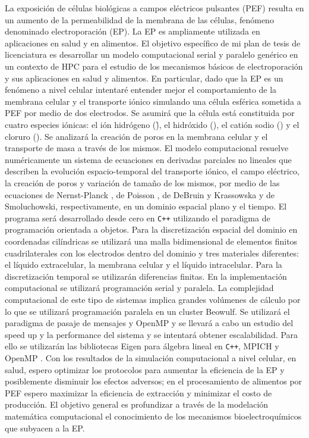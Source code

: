 \documentclass[a4paper,spanish]{article}
\begin{document}
La exposición de células biológicas a campos eléctricos pulsantes (PEF) resulta en un aumento de la permeabilidad de la membrana de las células, fenómeno denominado electroporación (EP). La EP es ampliamente utilizada en aplicaciones en salud y en alimentos. El objetivo específico de mi plan de tesis de licenciatura es desarrollar un modelo computacional serial y paralelo genérico en un contexto de HPC para el estudio de los mecanismos básicos de electroporación y sus aplicaciones en salud y alimentos.  En particular, dado que la EP es un fenómeno a nivel celular intentaré entender mejor el comportamiento de la membrana celular y el transporte iónico simulando una célula esférica sometida a PEF por medio de dos electrodos. Se asumirá que la célula está constituida  por cuatro especies iónicas: el ión hidrógeno (\h), el hidróxido (\oh), el catión sodio (\na) y el cloruro (\cl). Se  analizará la creación de poros en la membrana celular y el transporte de masa a través de los mismos. El modelo computacional resuelve numéricamente un sistema de ecuaciones en derivadas parciales no lineales que describen la evolución espacio-temporal del transporte iónico, el campo eléctrico, la creación de poros y variación de tamaño de los mismos, por medio de las ecuaciones de Nernst-Planck \cite{fodava}, de Poisson \cite{jianbo}, de DeBruin y Krassowska \cite{krass} y de Smoluchowski, respectivamente, en un dominio espacial plano y el tiempo. El programa será desarrollado desde cero en \texttt{C++} utilizando el paradigma de programación orientada a objetos. Para la discretización espacial del dominio en coordenadas cilíndricas se utilizará una malla bidimensional de  elementos finitos cuadrilaterales \cite{fem, fem-electro} con los electrodos dentro del dominio y tres materiales diferentes: el líquido extracelular, la membrana celular y el líquido intracelular. Para la discretización temporal se utilizarán diferencias finitas. En la implementación computacional se utilizará programación serial y paralela. La complejidad computacional de este tipo de sistemas implica grandes volúmenes de cálculo por lo que se utilizará programación paralela en un cluster Beowulf. Se utilizará el paradigma de pasaje de mensajes y  OpenMP y se llevará a cabo un estudio del speed up y la performance del sistema y se intentará obtener escalabilidad. Para ello se utilizarán las bibliotecas Eigen \cite{eigen} para álgebra lineal en \texttt{C++}, MPICH \cite{mpich} y OpenMP \cite{openmp}. Con los resultados de la  simulación computacional a nivel celular, en salud, espero optimizar los protocolos para aumentar la eficiencia de la EP y posiblemente disminuir los efectos adversos; en el procesamiento de alimentos por PEF espero maximizar la eficiencia de extracción y minimizar el costo de producción. El objetivo general es profundizar a través de la modelación matemática computacional el conocimiento de los mecanismos bioelectroquímicos que subyacen a la EP.
\end{document}
